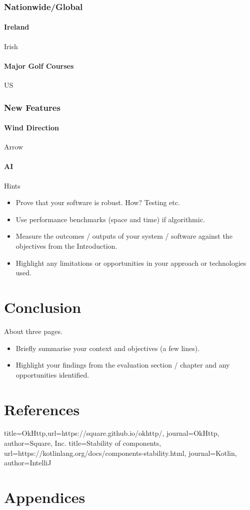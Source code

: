 \subsection{Nationwide/Global}
\subsubsection{Ireland}
Irish
\subsubsection{Major Golf Courses}
US
\subsection{New Features}
\subsubsection{Wind Direction}
Arrow
\subsubsection{AI}
Hints
\begin{itemize}
\item Prove that your software is robust. How? Testing etc.
\item Use performance benchmarks (space and time) if algorithmic.
\item Measure the outcomes / outputs of your system / software against the objectives from the Introduction.
\item Highlight any limitations or opportunities in your approach or technologies used.
\end{itemize}
\chapter{Conclusion}
About three pages.
\begin{itemize}
\item Briefly summarise your context and objectives (a few lines).
\item Highlight your findings from the evaluation section / chapter and any opportunities identified.
\end{itemize}
\chapter{References}

\begin{thebibliography}{9}
 {title={OkHttp},url={https://square.github.io/okhttp/}, journal={OkHttp}, author={Square, Inc.}}
 {title={Stability of components},
url={https://kotlinlang.org/docs/components-stability.html}, journal={Kotlin}, author={IntelliJ}}

\end{thebibliography}
\chapter{Appendices}